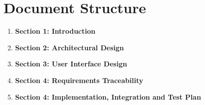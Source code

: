 \section{Document Structure}

\begin{enumerate}
    \item \textbf{Section 1: Introduction} \\
    \item \textbf{Section 2: Architectural Design} \\
    \item \textbf{Section 3: User Interface Design} \\
    \item \textbf{Section 4: Requirements Traceability} \\
    \item \textbf{Section 4: Implementation, Integration and Test Plan} \\
\end{enumerate}